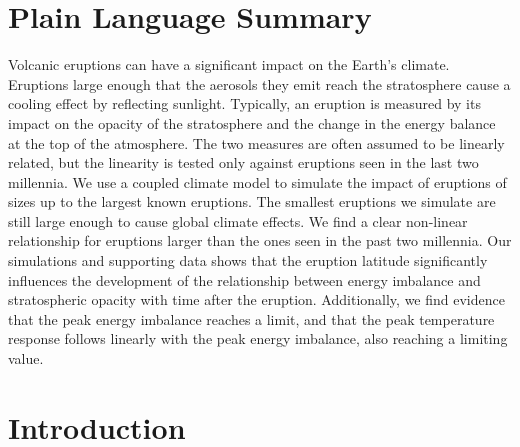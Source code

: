 \documentclass[draft]{agujournal2019}
\begin{document}
  \section*{Plain Language Summary}


  Volcanic eruptions can have a significant impact on the Earth's climate. Eruptions
  large enough that the aerosols they emit reach the stratosphere cause a cooling effect
  by reflecting sunlight. Typically, an eruption is measured by its impact on the
  opacity of the stratosphere and the change in the energy balance at the top of the
  atmosphere. The two measures are often assumed to be linearly related, but the
  linearity is tested only against eruptions seen in the last two millennia. We use a
  coupled climate model to simulate the impact of eruptions of sizes up to the largest
  known eruptions. The smallest eruptions we simulate are still large enough to cause
  global climate effects. We find a clear non-linear relationship for eruptions larger
  than the ones seen in the past two millennia. Our simulations and supporting data
  shows that the eruption latitude significantly influences the development of the
  relationship between energy imbalance and stratospheric opacity with time after the
  eruption. Additionally, we find evidence that the peak energy imbalance reaches a
  limit, and that the peak temperature response follows linearly with the peak energy
  imbalance, also reaching a limiting value.


  \section{Introduction}

\end{document}
